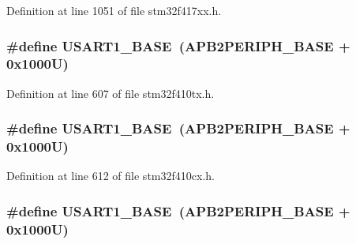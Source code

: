 Definition at line 1051 of file stm32f417xx.\+h.

\subsubsection[{\texorpdfstring{U\+S\+A\+R\+T1\+\_\+\+B\+A\+SE}{USART1_BASE}}]{\setlength{\rightskip}{0pt plus 5cm}\#define U\+S\+A\+R\+T1\+\_\+\+B\+A\+SE~({\bf A\+P\+B2\+P\+E\+R\+I\+P\+H\+\_\+\+B\+A\+SE} + 0x1000\+U)}\hypertarget{group___peripheral__registers__structures_ga86162ab3f740db9026c1320d46938b4d}{}\label{group___peripheral__registers__structures_ga86162ab3f740db9026c1320d46938b4d}


Definition at line 607 of file stm32f410tx.\+h.

\subsubsection[{\texorpdfstring{U\+S\+A\+R\+T1\+\_\+\+B\+A\+SE}{USART1_BASE}}]{\setlength{\rightskip}{0pt plus 5cm}\#define U\+S\+A\+R\+T1\+\_\+\+B\+A\+SE~({\bf A\+P\+B2\+P\+E\+R\+I\+P\+H\+\_\+\+B\+A\+SE} + 0x1000\+U)}\hypertarget{group___peripheral__registers__structures_ga86162ab3f740db9026c1320d46938b4d}{}\label{group___peripheral__registers__structures_ga86162ab3f740db9026c1320d46938b4d}


Definition at line 612 of file stm32f410cx.\+h.

\subsubsection[{\texorpdfstring{U\+S\+A\+R\+T1\+\_\+\+B\+A\+SE}{USART1_BASE}}]{\setlength{\rightskip}{0pt plus 5cm}\#define U\+S\+A\+R\+T1\+\_\+\+B\+A\+SE~({\bf A\+P\+B2\+P\+E\+R\+I\+P\+H\+\_\+\+B\+A\+SE} + 0x1000\+U)}\hypertarget{group___peripheral__registers__structures_ga86162ab3f740db9026c1320d46938b4d}{}\label{group___peripheral__registers__structures_ga86162ab3f740db9026c1320d46938b4d}


